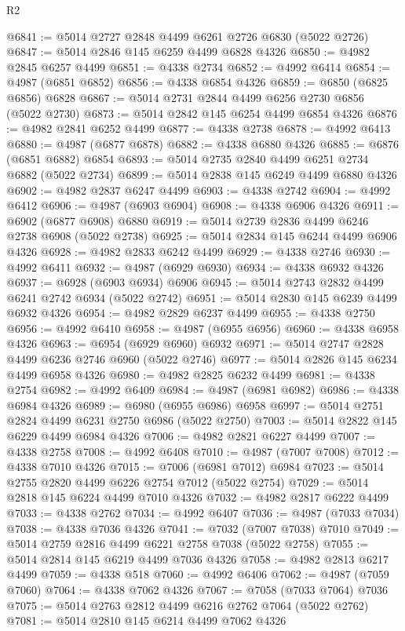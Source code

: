 \begin{lexlean}{R2}
\begin{coremodule}
@6841 := @5014 @2727 @2848 @4499 @6261 @2726 @6830 (@5022 @2726)
@6847 := @5014 @2846 @145 @6259 @4499 @6828 @4326
@6850 := @4982 @2845 @6257 @4499
@6851 := @4338 @2734
@6852 := @4992 @6414
@6854 := @4987 (@6851 @6852)
@6856 := @4338 @6854 @4326
@6859 := @6850 (@6825 @6856) @6828
@6867 := @5014 @2731 @2844 @4499 @6256 @2730 @6856 (@5022 @2730)
@6873 := @5014 @2842 @145 @6254 @4499 @6854 @4326
@6876 := @4982 @2841 @6252 @4499
@6877 := @4338 @2738
@6878 := @4992 @6413
@6880 := @4987 (@6877 @6878)
@6882 := @4338 @6880 @4326
@6885 := @6876 (@6851 @6882) @6854
@6893 := @5014 @2735 @2840 @4499 @6251 @2734 @6882 (@5022 @2734)
@6899 := @5014 @2838 @145 @6249 @4499 @6880 @4326
@6902 := @4982 @2837 @6247 @4499
@6903 := @4338 @2742
@6904 := @4992 @6412
@6906 := @4987 (@6903 @6904)
@6908 := @4338 @6906 @4326
@6911 := @6902 (@6877 @6908) @6880
@6919 := @5014 @2739 @2836 @4499 @6246 @2738 @6908 (@5022 @2738)
@6925 := @5014 @2834 @145 @6244 @4499 @6906 @4326
@6928 := @4982 @2833 @6242 @4499
@6929 := @4338 @2746
@6930 := @4992 @6411
@6932 := @4987 (@6929 @6930)
@6934 := @4338 @6932 @4326
@6937 := @6928 (@6903 @6934) @6906
@6945 := @5014 @2743 @2832 @4499 @6241 @2742 @6934 (@5022 @2742)
@6951 := @5014 @2830 @145 @6239 @4499 @6932 @4326
@6954 := @4982 @2829 @6237 @4499
@6955 := @4338 @2750
@6956 := @4992 @6410
@6958 := @4987 (@6955 @6956)
@6960 := @4338 @6958 @4326
@6963 := @6954 (@6929 @6960) @6932
@6971 := @5014 @2747 @2828 @4499 @6236 @2746 @6960 (@5022 @2746)
@6977 := @5014 @2826 @145 @6234 @4499 @6958 @4326
@6980 := @4982 @2825 @6232 @4499
@6981 := @4338 @2754
@6982 := @4992 @6409
@6984 := @4987 (@6981 @6982)
@6986 := @4338 @6984 @4326
@6989 := @6980 (@6955 @6986) @6958
@6997 := @5014 @2751 @2824 @4499 @6231 @2750 @6986 (@5022 @2750)
@7003 := @5014 @2822 @145 @6229 @4499 @6984 @4326
@7006 := @4982 @2821 @6227 @4499
@7007 := @4338 @2758
@7008 := @4992 @6408
@7010 := @4987 (@7007 @7008)
@7012 := @4338 @7010 @4326
@7015 := @7006 (@6981 @7012) @6984
@7023 := @5014 @2755 @2820 @4499 @6226 @2754 @7012 (@5022 @2754)
@7029 := @5014 @2818 @145 @6224 @4499 @7010 @4326
@7032 := @4982 @2817 @6222 @4499
@7033 := @4338 @2762
@7034 := @4992 @6407
@7036 := @4987 (@7033 @7034)
@7038 := @4338 @7036 @4326
@7041 := @7032 (@7007 @7038) @7010
@7049 := @5014 @2759 @2816 @4499 @6221 @2758 @7038 (@5022 @2758)
@7055 := @5014 @2814 @145 @6219 @4499 @7036 @4326
@7058 := @4982 @2813 @6217 @4499
@7059 := @4338 @518
@7060 := @4992 @6406
@7062 := @4987 (@7059 @7060)
@7064 := @4338 @7062 @4326
@7067 := @7058 (@7033 @7064) @7036
@7075 := @5014 @2763 @2812 @4499 @6216 @2762 @7064 (@5022 @2762)
@7081 := @5014 @2810 @145 @6214 @4499 @7062 @4326

\end{coremodule}
\end{lexlean}
